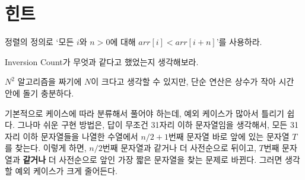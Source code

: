 \section{힌트}
\begin{hint}
    
\end{hint}
\begin{hint}
    정렬의 정의로 `모든 $i$와 $n>0$에 대해 $arr[i] < arr[i + n]$'를 사용하라.
\end{hint}
\begin{hint}
    Inversion Count가 무엇과 같다고 했었는지 생각해보라.
\end{hint}
\begin{hint}
    
\end{hint}
\begin{hint}
    
\end{hint}
\begin{hint}
    
\end{hint}
\begin{hint}
    
\end{hint}
\begin{hint}
    
\end{hint}
\begin{hint}
    
\end{hint}
\begin{hint}
    
\end{hint}
\begin{hint}
    
\end{hint}
\begin{hint}
    
\end{hint}
\begin{hint}
    
\end{hint}

\begin{hint}
    $N^2$ 알고리즘을 짜기에 $N$이 크다고 생각할 수 있지만, 단순 연산은 상수가 작아 시간 안에 돌기 충분하다.
\end{hint}

\begin{hint}
    기본적으로 케이스에 따라 분류해서 풀어야 하는데, 예외 케이스가 많아서 틀리기 쉽다. 그나마 쉬운 구현 방법은, 답이 무조건 31자리 이하 문자열임을 생각해서, 모든 31자리 이하 문자열들을 나열한 수열에서 $n/2+1$번째 문자열 바로 앞에 있는 문자열 $T$를 찾는다. 이렇게 하면, $n/2$번째 문자열과 같거나 더 사전순으로 뒤이고, $T$번째 문자열과 \textbf{같거나} 더 사전순으로 앞인 가장 짧은 문자열을 찾는 문제로 바뀐다. 그러면 생각할 예외 케이스가 크게 줄어든다.
\end{hint}

